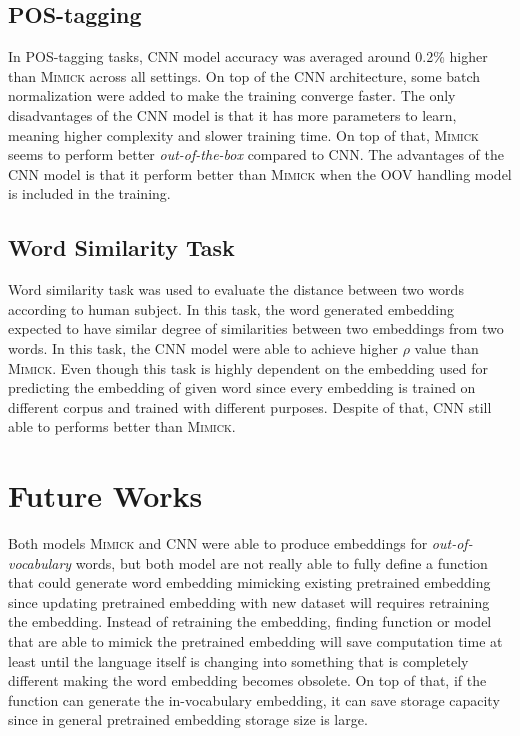 \subsection{POS-tagging}
In POS-tagging tasks, CNN model accuracy was averaged around 0.2\% higher than
\textsc{Mimick} across all settings. On top of the CNN architecture, some batch
normalization were added to make the training converge faster. The
only disadvantages of the CNN model is that it has more parameters to
learn, meaning higher complexity and slower training time. On top of
that, \textsc{Mimick} seems to perform better \textit{out-of-the-box}
compared to CNN. The advantages of the CNN model is that it perform
better than \textsc{Mimick} when the OOV handling model is included in
the training.

\subsection{Word Similarity Task}
Word similarity task was used to evaluate the distance between two
words according to human subject. In this task, the word generated
embedding expected to have similar degree of similarities between two
embeddings from two words. In this task, the CNN model were able to
achieve higher $\rho$ value than \textsc{Mimick}. Even though this
task is highly dependent on the embedding used for predicting the
embedding of given word since every embedding is trained on different
corpus and trained with different purposes. Despite of that, CNN still
able to performs better than \textsc{Mimick}.

\section{Future Works}
Both models \textsc{Mimick} and CNN were able to produce embeddings
for \textit{out-of-vocabulary} words, but both model are not really
able to fully define a function that could generate word embedding
mimicking existing pretrained embedding since updating pretrained
embedding with new dataset will requires retraining the embedding.
Instead of retraining the embedding, finding function or model that
are able to mimick the pretrained embedding will save computation time
at least until the language itself is changing into something that is
completely different making the word embedding becomes obsolete. On
top of that, if the function can generate the in-vocabulary embedding,
it can save storage capacity since in general pretrained embedding
storage size is large.